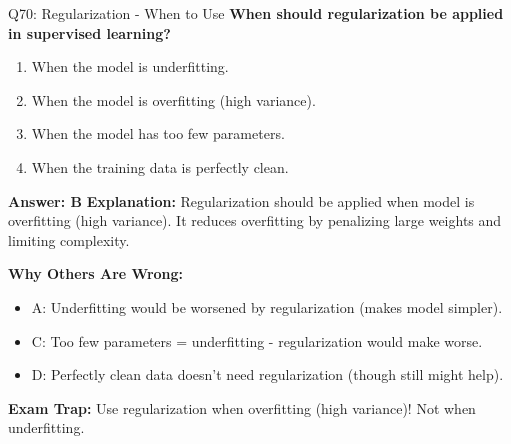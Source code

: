 \documentclass[8pt]{beamer}
\begin{document}
	\begin{frame}{Q70: Regularization - When to Use}
		\fontsize{6.5}{7.5}\selectfont
		\textbf{When should regularization be applied in supervised learning?}
		
		\begin{enumerate}
			\item When the model is underfitting.
			\item When the model is overfitting (high variance).
			\item When the model has too few parameters.
			\item When the training data is perfectly clean.
		\end{enumerate}
		
		\vspace{0.05cm}
		\textcolor{myblue}{\textbf{Answer: B}}
		\vspace{0.05cm}
		\textcolor{myblue}{\textbf{Explanation:}} Regularization should be applied when model is overfitting (high variance). It reduces overfitting by penalizing large weights and limiting complexity.
		
		\vspace{0.05cm}
		\textcolor{myred}{\textbf{Why Others Are Wrong:}}
		\begin{itemize}
			\item \textcolor{myred}{A:} Underfitting would be worsened by regularization (makes model simpler).
			\item \textcolor{myred}{C:} Too few parameters = underfitting - regularization would make worse.
			\item \textcolor{myred}{D:} Perfectly clean data doesn't need regularization (though still might help).
		\end{itemize}
		
		\textcolor{myred}{\textbf{Exam Trap:}} Use regularization when \textcolor{myblue}{overfitting} (high variance)! Not when underfitting.
	\end{frame}
	
\end{document}
